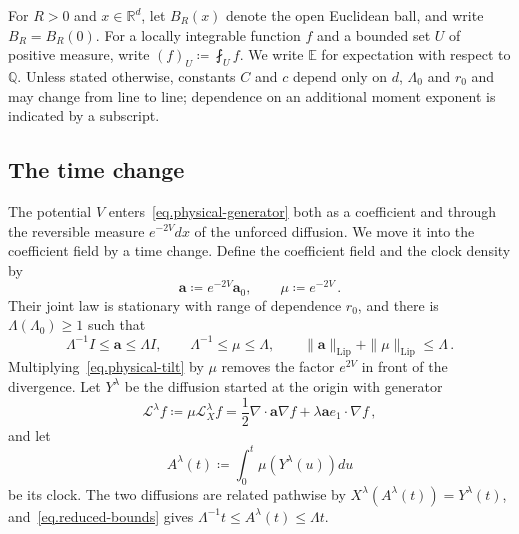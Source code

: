 \documentclass[11pt]{amsart}
\theoremstyle{definition}
\theoremstyle{remark}
\numberwithin{equation}{section}
\newcommand{\E}{\mathbb E}
\newcommand{\Q}{\mathbb Q}
\newcommand{\R}{\mathbb R}
\renewcommand{\a}{\mathbf a}
\begin{document}
For $R>0$ and $x\in\R^d$, let $B_R(x)$ denote the open Euclidean ball, and write $B_R=B_R(0)$. For a locally integrable function $f$ and a bounded set $U$ of positive measure, write $(f)_U\coloneqq\fint_Uf$. We write $\E$ for expectation with respect to $\Q$. Unless stated otherwise, constants $C$ and $c$ depend only on $d$, $\Lambda_0$ and $r_0$ and may change from line to line; dependence on an additional moment exponent is indicated by a subscript.

\subsection{The time change}\label{ss.time-change}

The potential $V$ enters~\eqref{eq.physical-generator} both as a coefficient and through the reversible measure $e^{-2V}dx$ of the unforced diffusion. We move it into the coefficient field by a time change. Define the coefficient field and the clock density by
\begin{equation}\label{eq.reduced-fields}
 \a\coloneqq e^{-2V}\a_0,
 \qquad \mu\coloneqq e^{-2V}\, .
\end{equation}
Their joint law is stationary with range of dependence $r_0$, and there is $\Lambda(\Lambda_0)\geq1$ such that
\begin{equation}\label{eq.reduced-bounds}
 \Lambda^{-1}I\leq\a\leq\Lambda I,
 \qquad \Lambda^{-1}\leq\mu\leq\Lambda,
 \qquad \|\a\|_{\mathrm{Lip}}+\|\mu\|_{\mathrm{Lip}}\leq\Lambda\, .
\end{equation}
Multiplying~\eqref{eq.physical-tilt} by $\mu$ removes the factor $e^{2V}$ in front of the divergence. Let $Y^\lambda$ be the diffusion started at the origin with generator
\begin{equation}\label{eq.reduced-generator}
 \mathcal L^\lambda f\coloneqq\mu\mathcal L_X^\lambda f
 =\frac12\nabla\cdot\a\nabla f+\lambda\a e_1\cdot\nabla f\, ,
\end{equation}
and let
\begin{equation}\label{eq.clock-definition}
 A^\lambda(t)\coloneqq\int_0^t\mu(Y^\lambda(u))du
\end{equation}
be its clock. The two diffusions are related pathwise by $X^\lambda(A^\lambda(t))=Y^\lambda(t)$, and~\eqref{eq.reduced-bounds} gives $\Lambda^{-1}t\leq A^\lambda(t)\leq\Lambda t$.
\end{document}
